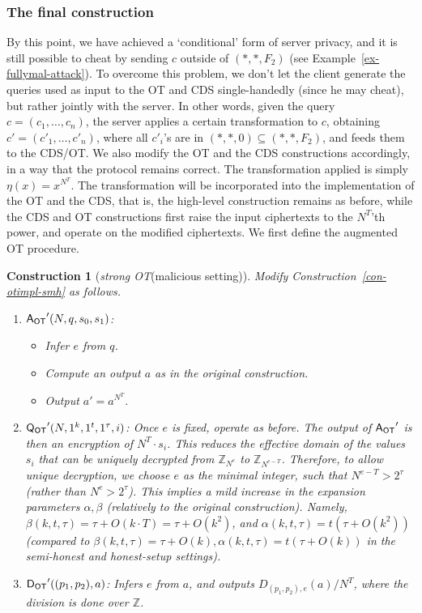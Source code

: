 \documentclass[11pt]{article}
\newtheorem{construction}[theorem]{Construction}
\newcommand{\queot}{{\sf Q_{OT}}}
\newcommand{\ansot}{{\sf A_{OT}}}
\newcommand{\decot}{{\sf D_{OT}}}
\newcommand{\otl}{{\tau}}
\newcommand{\decdj}{{D}_{(p_1,p_2),e}}
\newcommand{\Z}{\mathbb{Z}}
\newcommand\ot{\mbox{OT}\xspace}
\newcommand\strongot{{\em strong \ot\xspace}}
\begin{document}
\subsubsection{The final construction}
\label{subsec-mal-uncond}
By this point, we have achieved a `conditional' form of server privacy, and it is still possible
to cheat by sending $c$ outside of $(*,*,F_2)$ (see Example~\ref{ex-fullymal-attack}).
To overcome this problem, we don't let the client
generate the queries used as input to the \ot and CDS single-handedly (since he may cheat), but rather
jointly with the server. In other words, given the query $c=(c_1,\ldots,c_n)$, the server applies a certain transformation to $c$, obtaining $c'=(c'_1,\ldots,c'_n)$, where all $c'_i$'s are in $(*,*,0)\subseteq{(*,*,F_2)}$, and feeds them to the CDS/\ot. We also modify the \ot and the CDS constructions accordingly, in a way that the protocol remains correct.
The transformation applied is simply $\eta(x)=x^{N^T}$. The transformation will be incorporated into the implementation of the \ot and the CDS, that is, the high-level construction remains as before, while the CDS and \ot constructions first raise the input ciphertexts to the $N^T$'th power, and operate on the modified ciphertexts. We first define the augmented \ot procedure.
\begin{construction}[\strongot (malicious setting)]
\label{con-otimpl-mal}
Modify Construction~\ref{con-otimpl-smh} as follows.
\begin{enumerate}
\item $\ansot'(N,q,s_0,s_1)$:
\begin{itemize}
\item Infer $e$ from $q$.
\item Compute an output $a$ as in the original construction.
\item Output $a'=a^{N^T}$.
\end{itemize}
\item $\queot'(N,1^k,1^t,1^{\otl},i)$:
Once $e$ is fixed, operate as before.
The output of $\ansot'$ is then an encryption of $N^T\cdot s_i$.
This reduces the effective domain of the values $s_i$ that can be uniquely decrypted from $\Z_{N^e}$
to $\Z_{N^{e-T}}$. Therefore, to allow unique decryption, we choose $e$ as the minimal integer,
such that $N^{e-T}>2^{\otl}$ (rather than $N^e>2^{\otl}$). This implies a mild increase in the expansion
parameters $\alpha,\beta$ (relatively to the original construction). Namely, $\beta(k,t,\otl)=\otl+O(k\cdot T)=\otl+O(k^2)$, and $\alpha(k,t,\otl)=t(\otl+O(k^2))$ (compared to $\beta(k,t,\otl)=\otl+O(k),\alpha(k,t,\otl)=t(\otl+O(k))$ in the semi-honest
and honest-setup settings).
\item $\decot'((p_1,p_2),a)$: Infers $e$ from $a$, and outputs $\decdj(a)/N^T$, where the division is done over
$\Z$.
\end{enumerate}
\end{construction}
\end{document}
